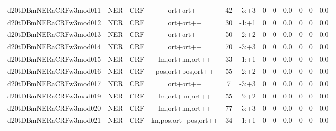 \documentclass[a4paper]{article}
\begin{document}
\begin{landscape}
\begin{center}
\begin{tabular}{ |c|c|c|c|c|c|c|c|c|c|c|c|}
 
 	
 	\small{ d20tDBmNERaCRFw3mod011 } & \small{ NER} & \small{  CRF }  & ort+ort++  &  42 &  \small{  -3:+3 }  &  0 & 0 & 0.0  &  0 & 0 & 0.0 \\
 	

 
 	
 	\small{ d20tDBmNERaCRFw3mod012 } & \small{ NER} & \small{  CRF }  & ort+ort++  &  30 &  \small{  -1:+1 }  &  0 & 0 & 0.0  &  0 & 0 & 0.0 \\
 	

 
 	
 	\small{ d20tDBmNERaCRFw3mod013 } & \small{ NER} & \small{  CRF }  & ort+ort++  &  50 &  \small{  -2:+2 }  &  0 & 0 & 0.0  &  0 & 0 & 0.0 \\
 	

 
 	
 	\small{ d20tDBmNERaCRFw3mod014 } & \small{ NER} & \small{  CRF }  & ort+ort++  &  70 &  \small{  -3:+3 }  &  0 & 0 & 0.0  &  0 & 0 & 0.0 \\
 	

 
 	
 	\small{ d20tDBmNERaCRFw3mod015 } & \small{ NER} & \small{  CRF }  & lm,ort+lm,ort++  &  33 &  \small{  -1:+1 }  &  0 & 0 & 0.0  &  0 & 0 & 0.0 \\
 	

 
 	
 	\small{ d20tDBmNERaCRFw3mod016 } & \small{ NER} & \small{  CRF }  & pos,ort+pos,ort++  &  55 &  \small{  -2:+2 }  &  0 & 0 & 0.0  &  0 & 0 & 0.0 \\
 	

 
 	
 	\small{ d20tDBmNERaCRFw3mod017 } & \small{ NER} & \small{  CRF }  & ort+ort++  &  7 &  \small{  -3:+3 }  &  0 & 0 & 0.0  &  0 & 0 & 0.0 \\
 	

 
 	
 	\small{ d20tDBmNERaCRFw3mod019 } & \small{ NER} & \small{  CRF }  & lm,ort+lm,ort++  &  55 &  \small{  -2:+2 }  &  0 & 0 & 0.0  &  0 & 0 & 0.0 \\
 	

 
 	
 	\small{ d20tDBmNERaCRFw3mod020 } & \small{ NER} & \small{  CRF }  & lm,ort+lm,ort++  &  77 &  \small{  -3:+3 }  &  0 & 0 & 0.0  &  0 & 0 & 0.0 \\
 	

 
 	
 	\small{ d20tDBmNERaCRFw3mod021 } & \small{ NER} & \small{  CRF }  & lm,pos,ort+pos,ort++  &  34 &  \small{  -1:+1 }  &  0 & 0 & 0.0  &  0 & 0 & 0.0 \\
 	


\end{tabular}
\end{center}
\end{landscape}
\end{document}
